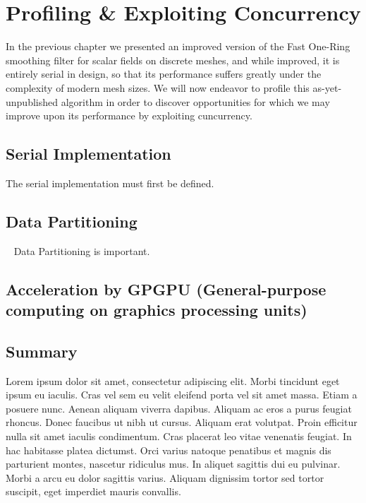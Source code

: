 \chapter{Profiling \& Exploiting Concurrency}
In the previous chapter we presented an improved version of the Fast One-Ring smoothing filter for scalar fields on discrete meshes, and while improved, it is entirely serial in design, so that its performance suffers greatly under the complexity of modern mesh sizes. We will now endeavor to profile this as-yet-unpublished algorithm in order to discover opportunities for which we may improve upon its performance by exploiting cuncurrency.
%
\section{Serial Implementation}
The serial implementation must first be defined.

%
\section{Data Partitioning}~\cite[p.~357]{Lang17}
Data Partitioning is important.


%
\section[Acceleration by GPGPU]{Acceleration by GPGPU (General-purpose
computing on graphics processing units)}

%
\section{Summary}
Lorem ipsum dolor sit amet, consectetur adipiscing elit. Morbi tincidunt eget
ipsum eu iaculis. Cras vel sem eu velit eleifend porta vel sit amet massa. Etiam
a posuere nunc. Aenean aliquam viverra dapibus. Aliquam ac eros a purus feugiat
rhoncus. Donec faucibus ut nibh ut cursus. Aliquam erat volutpat. Proin efficitur
nulla sit amet iaculis condimentum. Cras placerat leo vitae venenatis feugiat. In
hac habitasse platea dictumst. Orci varius natoque penatibus et magnis dis
parturient montes, nascetur ridiculus mus. In aliquet sagittis dui eu pulvinar.
Morbi a arcu eu dolor sagittis varius. Aliquam dignissim tortor sed tortor
suscipit, eget imperdiet mauris convallis.
